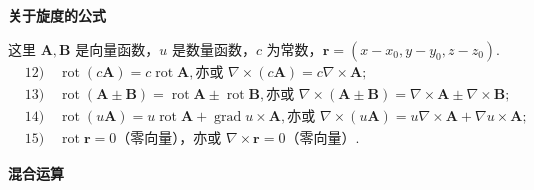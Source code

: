 \documentclass[UTF8,12pt,a4paper,fontset=fandol]{ctexart}
\begin{document}
\noindent\textbf{关于旋度的公式}

这里 $\mathbf A,\mathbf B$ 是向量函数，$u$ 是数量函数，$c$ 为常数，$\mathbf r=(x-x_0,y-y_0,z-z_0)$.
\[
\begin{aligned}
&12)\quad \operatorname{rot}(c\mathbf A)=c\operatorname{rot}\mathbf A,\text{亦或 }\nabla\times(c\mathbf A)=c\nabla\times\mathbf A;\\
&13)\quad \operatorname{rot}(\mathbf A\pm\mathbf B)=\operatorname{rot}\mathbf A\pm\operatorname{rot}\mathbf B,\text{亦或 }\nabla\times(\mathbf A\pm\mathbf B)=\nabla\times\mathbf A\pm\nabla\times\mathbf B;\\
&14)\quad \operatorname{rot}(u\mathbf A)=u\operatorname{rot}\mathbf A+\operatorname{grad}u\times\mathbf A,\text{亦或 }\nabla\times(u\mathbf A)=u\nabla\times\mathbf A+\nabla u\times\mathbf A;\\
&15)\quad \operatorname{rot}\mathbf r=0\text{（零向量），亦或 }\nabla\times\mathbf r=0\text{（零向量）}.
\end{aligned}
\]

\noindent\textbf{混合运算}
\end{document}
